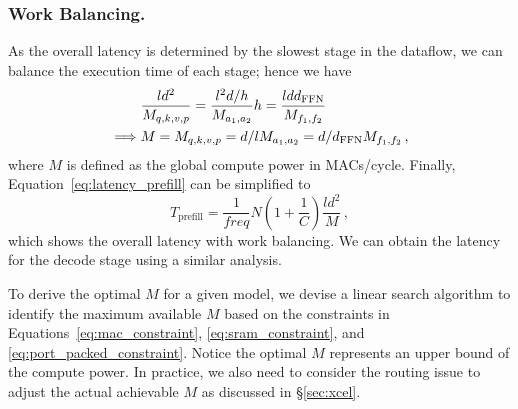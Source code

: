 \subsubsection{Work Balancing.}
As the overall latency is determined by the slowest stage in the dataflow, we can balance the execution time of each stage; hence we have
\begin{align}
    &\frac{ld^2}{M_{q,k,v,p}}=\frac{l^2d/h}{M_{a_{1},a_{2}}}h=\frac{ldd_{\text{FFN}}}{M_{f_{1},f_{2}}}\\
    \label{eq:m}
    \implies& M=M_{q,k,v,p}=d/l M_{a_{1},a_{2}}=d/d_{\text{FFN}} M_{f_{1},f_{2}}\,,
\end{align}
where $M$ is defined as the global compute power in MACs/cycle.
Finally, Equation~\eqref{eq:latency_prefill} can be simplified to 
\begin{equation}
T_{\text{prefill}}=\frac{1}{freq}N\left(1+\frac{1}{C}\right)\frac{ld^2}{M}\,,
\end{equation}
which shows the overall latency with work balancing.
We can obtain the latency for the decode stage using a similar analysis.

To derive the optimal $M$ for a given model, we devise a linear search algorithm to identify the maximum available $M$ based on the constraints in Equations~\eqref{eq:mac_constraint}, \eqref{eq:sram_constraint}, and \eqref{eq:port_packed_constraint}.
Notice the optimal $M$ represents an upper bound of the compute power.
In practice, we also need to consider the routing issue to adjust the actual achievable $M$ as discussed in \S\ref{sec:xcel}.

